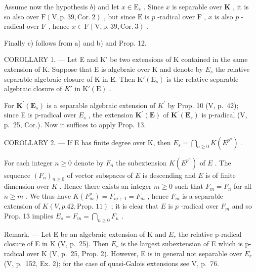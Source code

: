 Assume now the hypothesis \(b)\) and let \(x \in \mathrm{E}_s\) . Since \(x\) is separable over \(\mathbf{K}\) , it is so also over \(\mathrm{F}(\mathrm{V}, \mathrm{p.~39}, \mathrm{Cor.~2})\) , but since \(\mathrm{E}\) is \(p\) -radical over \(\mathrm{F}\) , \(x\) is also \(p\) -radical over \(\mathrm{F}\) , hence \(x \in \mathrm{F}(\mathrm{V}, \mathrm{p.~39}, \mathrm{Cor.~3})\) .

Finally c) follows from a) and b) and Prop. 12.

COROLLARY 1. --- Let E and K' be two extensions of K contained in the same extension of K. Suppose that E is algebraic over K and denote by \(E_{s}\) the relative separable algebraic closure of K in E. Then \(\mathrm{K}'(\mathrm{E}_{s})\) is the relative separable algebraic closure of \(K'\) in \(\mathrm{K}'(\mathrm{E})\) .

For \(\mathbf{K}^{\prime}(\mathbf{E}_{s})\) is a separable algebraic extension of \(K^{\prime}\) by Prop. 10 (V, p.~42); since E is p-radical over \(E_{s}\) , the extension \(\mathbf{K}^{\prime}(\mathbf{E})\) of \(\mathbf{K}^{\prime}(\mathbf{E}_{s})\) is p-radical (V, p.~25, Cor.). Now it suffices to apply Prop. 13.

COROLLARY 2. --- If E has finite degree over K, then \(E_{s} = \bigcap_{n \geqslant 0} K(E^{p^{n}})\) .

For each integer \(n \geqslant 0\) denote by \(F_n\) the subextension \(K(E^{p^n})\) of \(E\) . The sequence \((F_n)_{n \geqslant 0}\) of vector subspaces of \(E\) is descending and \(E\) is of finite dimension over \(K\) . Hence there exists an integer \(m \geqslant 0\) such that \(F_m = F_n\) for all \(n \geqslant m\) . We thus have \(K(F_m^p) = F_{m+1} = F_m\) , hence \(F_m\) is a separable extension of \(K(V, p. 42, \text{Prop. } 11)\) ; it is clear that \(E\) is \(p\) -radical over \(F_m\) and so Prop. 13 implies \(E_s = F_m = \bigcap_{n \geqslant 0} F_n\) .

Remark. --- Let E be an algebraic extension of K and \(E_{r}\) the relative p-radical closure of E in K (V, p.~25). Then \(E_{r}\) is the largest subextension of E which is p-radical over K (V, p.~25, Prop. 2). However, E is in general not separable over \(E_{r}\) (V, p.~152, Ex. 2); for the case of quasi-Galois extensions see V, p.~76.

